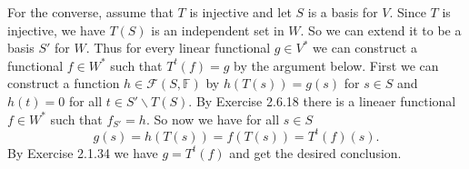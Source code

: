 \begin{enumerate}
\begin{enumerate}
For the converse, assume that $T$ is injective and let $S$ is a basis for $V$. Since $T$ is injective, we have $T(S)$ is an independent set in $W$. So we can extend it to be a basis $S'$ for $W$. Thus for every linear functional $g\in V^*$ we can construct a functional $f\in W^*$ such that $T^t(f)=g$ by the argument below. First we can construct a function $h\in \mathcal{F}(S,\mathbb{F})$ by $h(T(s))=g(s)$ for $s\in S$ and $h(t)=0$ for all $t\in S'\backslash T(S)$. By Exercise 2.6.18 there is a lineaer functional $f\in W^*$ such that $f_{S'}=h$. So now we have for all $s\in S$
\[g(s)=h(T(s))=f(T(s))=T^t(f)(s).\]
By Exercise 2.1.34 we have $g=T^t(f)$ and get the desired conclusion.
\end{enumerate}
\end{enumerate}
